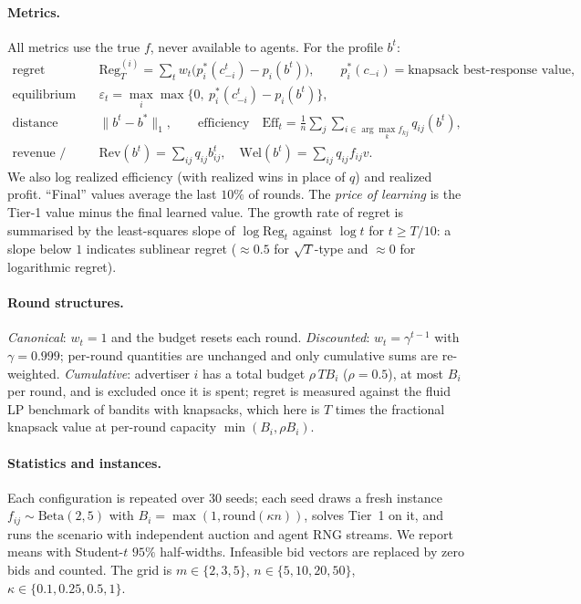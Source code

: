 \documentclass[11pt]{article}
\theoremstyle{remark}
\newcommand{\Reg}{\mathrm{Reg}}
\begin{document}
\paragraph{Metrics.} All metrics use the true $f$, never available to agents. For the profile $b^t$:
\begin{align*}
\text{regret} \quad & \Reg^{(i)}_T=\textstyle\sum_{t} w_t\big(p_i^*(c^t_{-i})-p_i(b^t)\big), \qquad
  p_i^*(c_{-i})=\text{knapsack best-response value},\\
\text{equilibrium gap} \quad & \varepsilon_t=\max_i \max\{0,\ p_i^*(c^t_{-i})-p_i(b^t)\},\\
\text{distance} \quad & \|b^t-b^*\|_1,\qquad
\text{efficiency}\quad \mathrm{Eff}_t=\tfrac1n\textstyle\sum_j\sum_{i\in\arg\max_k f_{kj}} q_{ij}(b^t),\\
\text{revenue / welfare} \quad & \mathrm{Rev}(b^t)=\textstyle\sum_{ij}q_{ij}b^t_{ij},\quad
\mathrm{Wel}(b^t)=\textstyle\sum_{ij}q_{ij}f_{ij}v .
\end{align*}
We also log realized efficiency (with realized wins in place of $q$) and realized profit. ``Final''
values average the last $10\%$ of rounds. The \emph{price of learning} is the Tier-1 value minus the
final learned value. The growth rate of regret is summarised by the least-squares slope of
$\log\Reg_t$ against $\log t$ for $t\ge T/10$: a slope below $1$ indicates sublinear regret ($\approx0.5$
for $\sqrt{T}$-type and $\approx 0$ for logarithmic regret).

\paragraph{Round structures.} \emph{Canonical}: $w_t=1$ and the budget resets each round.
\emph{Discounted}: $w_t=\gamma^{t-1}$ with $\gamma=0.999$; per-round quantities are unchanged and only
cumulative sums are re-weighted. \emph{Cumulative}: advertiser $i$ has a total budget
$\rho\,T B_i$ ($\rho=0.5$), at most $B_i$ per round, and is excluded once it is spent; regret is
measured against the fluid LP benchmark of bandits with knapsacks, which here is $T$ times the
fractional knapsack value at per-round capacity $\min(B_i,\rho B_i)$.

\paragraph{Statistics and instances.} Each configuration is repeated over $30$ seeds; each seed draws a
fresh instance $f_{ij}\sim\mathrm{Beta}(2,5)$ with $B_i=\max(1,\mathrm{round}(\kappa n))$, solves Tier~1
on it, and runs the scenario with independent auction and agent RNG streams. We report means with
Student-$t$ $95\%$ half-widths. Infeasible bid vectors are replaced by zero bids and counted. The grid
is $m\in\{2,3,5\}$, $n\in\{5,10,20,50\}$, $\kappa\in\{0.1,0.25,0.5,1\}$.
\end{document}

